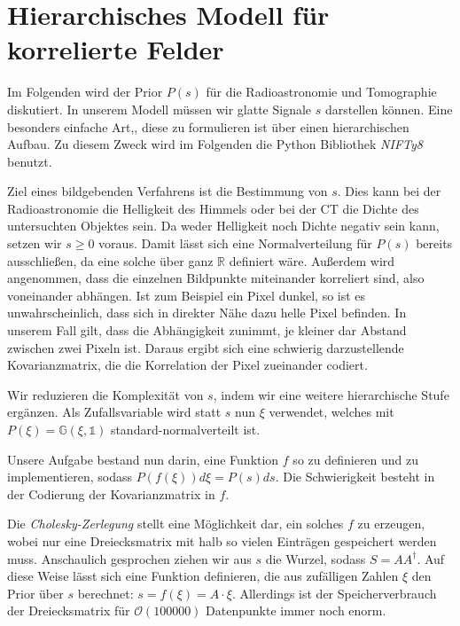 \section{Hierarchisches Modell für korrelierte Felder}\label{k4.2.hiera}
Im Folgenden wird der Prior $P(s)$ für die Radioastronomie und Tomographie diskutiert. In unserem Modell müssen wir glatte Signale $s$ darstellen können. Eine besonders einfache Art,, diese zu formulieren ist über einen hierarchischen Aufbau. Zu diesem Zweck wird im Folgenden die Python Bibliothek \emph{NIFTy8} benutzt.

Ziel eines bildgebenden Verfahrens ist die Bestimmung von $s$. Dies kann bei der Radioastronomie die Helligkeit des Himmels oder bei der CT die Dichte des untersuchten Objektes sein. Da weder Helligkeit noch Dichte negativ sein kann, setzen wir $s \geq 0$ voraus. Damit lässt sich eine Normalverteilung für $P(s)$ bereits ausschließen, da eine solche über ganz $\mathbb{R}$ definiert wäre. Außerdem wird angenommen, dass die einzelnen Bildpunkte miteinander korreliert sind, also voneinander abhängen. Ist zum Beispiel ein Pixel dunkel, so ist es unwahrscheinlich, dass sich in direkter Nähe dazu helle Pixel befinden. In unserem Fall gilt, dass die Abhängigkeit zunimmt, je kleiner dar Abstand zwischen zwei Pixeln ist. Daraus ergibt sich eine schwierig darzustellende Kovarianzmatrix, die die Korrelation der Pixel zueinander codiert.

Wir reduzieren die Komplexität von $s$, indem wir eine weitere hierarchische Stufe ergänzen. Als Zufallsvariable wird statt $s$ nun $\xi$ verwendet, welches mit $P(\xi) = \mathbb{G}(\xi, \mathds{1})$ standard-normalverteilt ist.

Unsere Aufgabe bestand nun darin, eine Funktion $f$ so zu definieren und zu implementieren, sodass $P(f(\xi)) d \xi = P(s) ds$. Die Schwierigkeit besteht in der Codierung der Kovarianzmatrix in $f$.

Die \emph{Cholesky-Zerlegung} stellt eine Möglichkeit dar, ein solches $f$ zu erzeugen, wobei nur eine Dreiecksmatrix mit halb so vielen Einträgen gespeichert werden muss. Anschaulich gesprochen ziehen wir aus $s$ die Wurzel, sodass $S=A A^{\dagger}$. Auf diese Weise lässt sich eine Funktion definieren, die aus zufälligen Zahlen $\xi$ den Prior über $s$ berechnet: $s = f(\xi) = A \cdot \xi$. Allerdings ist der Speicherverbrauch der Dreiecksmatrix für $\mathcal{O}(100 000)$ Datenpunkte immer noch enorm.

